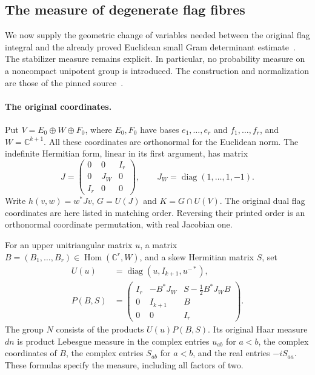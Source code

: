 \subsection{The measure of degenerate flag fibres}
\label{shared-degenerate-flag-fibres}

We now supply the geometric change of variables needed between
the original flag integral and the already proved Euclidean
small Gram determinant estimate~\cite{global-gram-degenerate-euclidean-volume}.
The stabilizer measure remains
explicit.  In particular, no probability measure on a noncompact
unipotent group is introduced.  The construction and normalization
are those of the pinned source~\cite{global-gram-degenerate-fibres-source}.

\paragraph{The original coordinates.}
Put $V=E_0\oplus W\oplus F_0$, where $E_0,F_0$ have bases
$e_1,\ldots,e_r$ and $f_1,\ldots,f_r$, and
$W=\mathbb C^{k+1}$.  All these coordinates are orthonormal for
the Euclidean norm.  The indefinite Hermitian form, linear in its
first argument, has matrix
\[
 J=\begin{pmatrix}0&0&I_r\\0&J_W&0\\I_r&0&0\end{pmatrix},
 \qquad J_W=\operatorname{diag}(1,\ldots,1,-1).
\]
Write $h(v,w)=w^*Jv$, $G=U(J)$ and $K=G\cap U(V)$.
The original dual flag coordinates are here listed in matching
order.  Reversing their printed order is an orthonormal coordinate
permutation, with real Jacobian one.

For an upper unitriangular matrix $u$, a matrix
$B=(B_1,\ldots,B_r)\in\operatorname{Hom}(\mathbb C^r,W)$,
and a skew Hermitian matrix $S$, set
\begin{align*}
 U(u)&=\operatorname{diag}(u,I_{k+1},u^{-*}),\\
 P(B,S)&=\begin{pmatrix}
 I_r&-B^*J_W&S-\tfrac12B^*J_WB\\
 0&I_{k+1}&B\\0&0&I_r
 \end{pmatrix}.
\end{align*}
The group $N$ consists of the products $U(u)P(B,S)$.
Its original Haar measure $dn$ is product Lebesgue measure in
the complex entries $u_{ab}$ for $a<b$, the complex coordinates
of $B$, the complex entries $S_{ab}$ for $a<b$, and the real
entries $-iS_{aa}$.  These formulas specify the measure, including
all factors of two.


